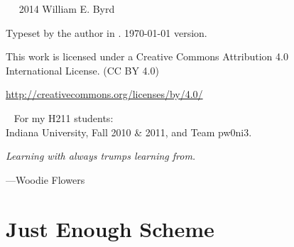 \documentclass[11pt]{book}
\newcommand{\blankpage}{\newpage\hbox{}\thispagestyle{empty}\newpage} %
\begin{document}
\begin{schemeregion}

\frontmatter
{} %



\blankpage




\newpage

~\vfill
\thispagestyle{empty}
\setlength{\parindent}{0pt}
\setlength{\parskip}{\baselineskip}
\large
\noindent
\textcopyright~2014 William E. Byrd

\noindent
Typeset by the author in \XeLaTeX.
\today\xspace version.

\huge
\noindent
\ccLogo
\ccAttribution

\large
\noindent
This work is licensed under a Creative Commons Attribution 4.0\\International License.
(CC BY 4.0)

\noindent
\url{http://creativecommons.org/licenses/by/4.0/}
\normalsize



\cleardoublepage
\thispagestyle{empty}
~\vfill
\Large
For my H211 students: \\Indiana University, Fall 2010 \& 2011, and Team pw0ni3.
\begin{flushright}
\Large
\vspace{5mm}
\textit{Learning with always trumps learning from.}

---Woodie Flowers
\end{flushright}
\vfill
\vfill
\normalsize

\blankpage

\tableofcontents



\mainmatter
{}




\chapter{Just Enough Scheme}


\end{schemeregion}
\end{document}
